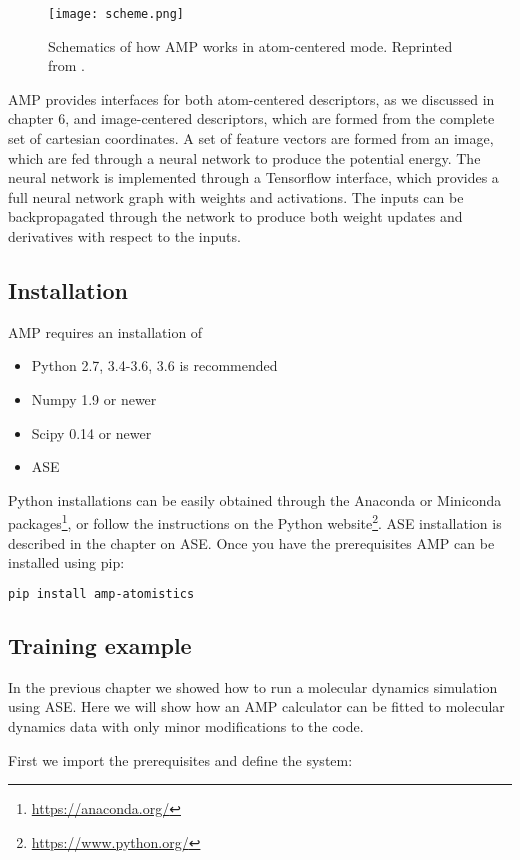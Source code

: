 \begin{figure}[h]
\centering
\texttt{[image: scheme.png]}
\caption{Schematics of how AMP works in atom-centered mode.
    Reprinted from \parencite[AMP paper]{khorshidi2016amp}.}
\label{fig:scheme}
\end{figure}

AMP provides interfaces for both atom-centered descriptors, as we
discussed in chapter 6, and image-centered descriptors,
which are formed from the complete set of cartesian coordinates.
A set of feature vectors are formed from an image, which are fed
through a neural network to produce the potential energy.
The neural network is implemented through a Tensorflow interface,
which provides a full neural network graph with weights and
activations. The inputs can be backpropagated through the network
to produce both weight updates and derivatives with respect to
the inputs.

\subsection{Installation}
AMP requires an installation of

\begin{itemize}
    \item Python 2.7, 3.4-3.6, 3.6 is recommended
    \item Numpy 1.9 or newer
    \item Scipy 0.14 or newer
    \item ASE
\end{itemize}

Python installations can be easily obtained through the Anaconda 
or Miniconda packages\footnote{\url{https://anaconda.org/}},
or follow the instructions on the Python website\footnote{
\url{https://www.python.org/}}.
ASE installation is described in the chapter on ASE.
Once you have the prerequisites AMP can be installed using pip:

\begin{lstlisting}[language=bash]
pip install amp-atomistics
\end{lstlisting}

\subsection{Training example}
In the previous chapter we showed how to run a molecular dynamics
simulation using ASE. Here we will show how an AMP calculator
can be fitted to molecular dynamics data with only minor
modifications to the code.
\par
First we import the prerequisites and define the system:

